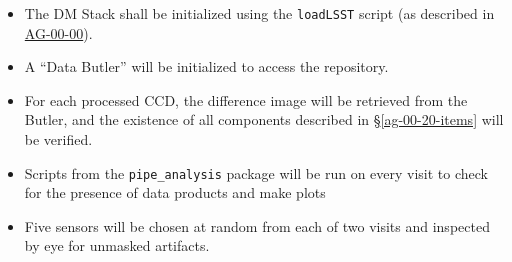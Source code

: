 \begin{itemize}

  \item{The DM Stack shall be initialized using the \texttt{loadLSST} script
  (as described in \hyperref[ag-00-00]{AG-00-00}).}

  \item{A ``Data Butler'' will be initialized to access the repository.}

  \item{For each processed CCD, the difference image 
	  will be retrieved from the Butler, and
  the existence of all components described in \S\ref{ag-00-20-items} will be
  verified.}

  \item{Scripts from the \texttt{pipe\_analysis} package will be run on every visit to check for the presence of data products and make plots}

  \item{Five sensors will be chosen at random from each of two visits and inspected by eye for unmasked artifacts.}

\end{itemize}
